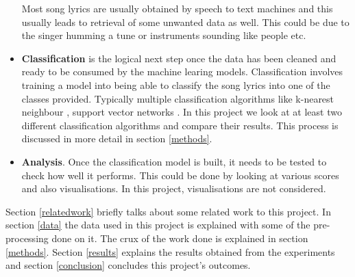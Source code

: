 \documentclass[11pt,a4paper]{article}
\begin{document}
\begin{itemize}
  Most song lyrics are usually obtained by speech to text machines \cite{gupta2019automatic, anna2016retrieval, annamaria2010recognition} and this usually leads to retrieval of some unwanted data as well. This could be due to the singer humming a tune or instruments sounding like people etc.
  \item \textbf{Classification} is the logical next step once the data has been cleaned and ready to be consumed by the machine learing models. Classification involves training a model into being able to classify the song lyrics into one of the classes provided. Typically multiple classification algorithms like k-nearest neighbour \cite{guo2004knn}, support vector networks \cite{Cortes:1995:SN:218919.218929}. In this project we look at at least two different classification algorithms and compare their results. This process is discussed in more detail in section \ref{methods}.
  \item \textbf{Analysis}. Once the classification model is built, it needs to be tested to check how well it performs. This could be done by looking at various scores and also visualisations. In this project, visualisations are not considered.
\end{itemize}
Section \ref{relatedwork} briefly talks about some related work to this project. In section \ref{data} the data used in this project is explained with some of the pre-processing done on it. The crux of the work done is explained in section \ref{methods}. Section \ref{results} explains the results obtained from the experiments and section \ref{conclusion} concludes this project's outcomes.
\end{document}

